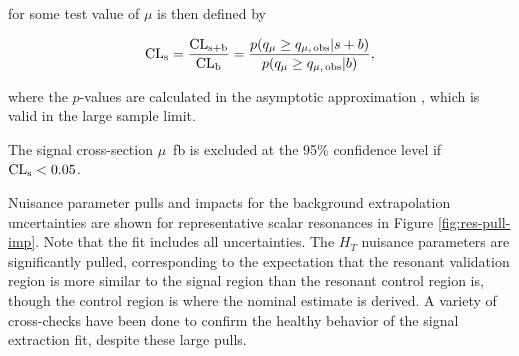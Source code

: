 \CLs for some test value of $\mu$ is then defined by

\begin{equation}
	\label{eqn:cls-def}
	\text{CL}\textsubscript{s} = \frac{\text{CL}\textsubscript{s+b}}{\text{CL}\textsubscript{b}} = \frac{p\qty({q}_{\mu} \ge {q}_{\mu,\,\text{obs}} | s + b)}{p\qty({q}_{\mu} \ge {q}_{\mu,\,\text{obs}} | b)},
\end{equation}

where the $p$-values are calculated in the asymptotic approximation
\cite{Cowan11}, which is valid in the large sample limit.

The signal cross-section {$\mu$}~\si{\femto\barn} is excluded at the 95\% confidence level if $\text{CL}\textsubscript{s} < 0.05$.

Nuisance parameter pulls and impacts for the background extrapolation uncertainties are shown for representative scalar 
resonances in Figure \ref{fig:res-pull-imp}. Note that the fit includes all uncertainties. The $H_{T}$ nuisance 
parameters are significantly pulled, corresponding to the expectation that the resonant validation region is 
more similar to the signal region than the resonant control region is, though the control region is 
where the nominal estimate is derived. A variety of 
cross-checks have been done to confirm the healthy behavior of the signal extraction fit, despite these large pulls.
